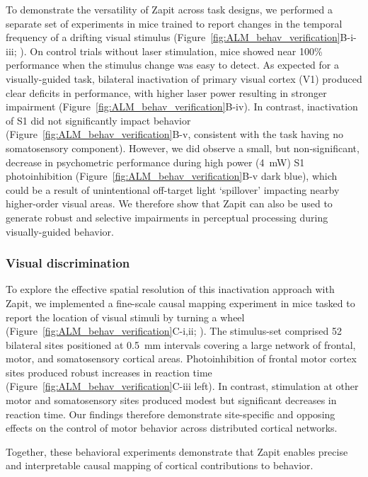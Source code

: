 \documentclass[9pt,lineno]{elife}
\begin{document}
To demonstrate the versatility of Zapit across task designs, we performed a separate set of experiments in mice trained to report changes in the temporal frequency of a drifting visual stimulus (Figure~\ref{fig:ALM_behav_verification}B-i-iii; \citealp{Orsolic2021MesoscaleDecision-making.}).
On control trials without laser stimulation, mice showed near 100\% performance when the stimulus change was easy to detect.
As expected for a visually-guided task, bilateral inactivation of primary visual cortex (V1) produced clear deficits in performance, with higher laser power resulting in stronger impairment (Figure~\ref{fig:ALM_behav_verification}B-iv).
In contrast, inactivation of S1 did not significantly impact behavior (Figure~\ref{fig:ALM_behav_verification}B-v, consistent with the task having no somatosensory component).
However, we did observe a small, but non-significant, decrease in psychometric performance during high power (4~mW) S1 photoinhibition (Figure~\ref{fig:ALM_behav_verification}B-v dark blue), which could be a result of unintentional off-target light ‘spillover’ impacting nearby higher-order visual areas.
We therefore show that Zapit can also be used to generate robust and selective impairments in perceptual processing during visually-guided behavior.

\subsubsection{Visual discrimination}

To explore the effective spatial resolution of this inactivation approach with Zapit, we implemented a fine-scale causal mapping experiment in mice tasked to report the location of visual stimuli by turning a wheel (Figure~\ref{fig:ALM_behav_verification}C-i,ii; \citealp{InternationalBrainLaboratory2021StandardizedMice, InternationalBrainLaboratory2025ABehaviour}).
The stimulus-set comprised 52 bilateral sites positioned at 0.5~mm intervals covering a large network of frontal, motor, and somatosensory cortical areas.
Photoinhibition of frontal motor cortex sites produced robust increases in reaction time (Figure~\ref{fig:ALM_behav_verification}C-iii left).
In contrast, stimulation at other motor and somatosensory sites produced modest but significant decreases in reaction time.
Our findings therefore demonstrate site-specific and opposing effects on the control of motor behavior across distributed cortical networks.

Together, these behavioral experiments demonstrate that Zapit enables precise and interpretable causal mapping of cortical contributions to behavior.
\end{document}
